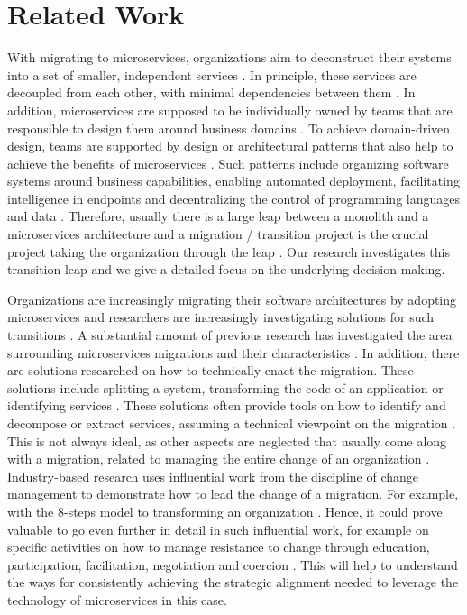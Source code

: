 \documentclass[sigconf,dvipsnames]{acmart}
\begin{document}
\section{Related Work}
With migrating to microservices, organizations aim to deconstruct their systems into a set of smaller, independent services \cite{Dragoni2017}. In principle, these services are decoupled from each other, with minimal dependencies between them \cite{newman2015building}. In addition, microservices are supposed to be individually owned by teams that are responsible to design them around business domains \cite{Zimmermann2017}. To achieve domain-driven design, teams are supported by design or architectural patterns that also help to achieve the benefits of microservices \cite{thones2015microservices}. Such patterns include organizing software systems around business capabilities, enabling automated deployment, facilitating intelligence in endpoints and decentralizing the control of programming languages and data \cite{DiFrancesco2019}.
Therefore, usually there is a large leap between a monolith and a microservices architecture and a migration / transition project is the crucial project taking the organization through the leap \cite{Hassan2020}.
Our research investigates this transition leap and we give a detailed focus on the underlying decision-making.

Organizations are increasingly migrating their software architectures by adopting microservices and researchers are increasingly investigating solutions for such transitions \cite{Hassan2020}. A substantial amount of previous research has investigated the area surrounding microservices migrations and their characteristics \cite{Balalaie2018, Taibi2017, Fritzsch2019}. In addition, there are solutions researched on how to technically enact the migration. These solutions include splitting a system, transforming the code of an application or identifying services \cite{fritzsch2018monolith}. These solutions often provide tools on how to identify and decompose or extract services, assuming a technical viewpoint on the migration \cite{Gysel2016}. This is not always ideal, as other aspects are neglected that usually come along with a migration, related to managing the entire change of an organization \cite{newman2019monolith}. Industry-based research uses influential work from the discipline of change management to demonstrate how to lead the change of a migration. For example, with the 8-steps model to transforming an organization \cite{kotter1995leading}. Hence, it could prove valuable to go even further in detail in such influential work, for example on specific activities on how to manage resistance to change through education, participation, facilitation, negotiation and coercion \cite{kotter1979choosing}. This will help to understand the ways for consistently achieving the strategic alignment needed to leverage the technology \cite{Venkatraman1999} of microservices in this case. 
\end{document}
